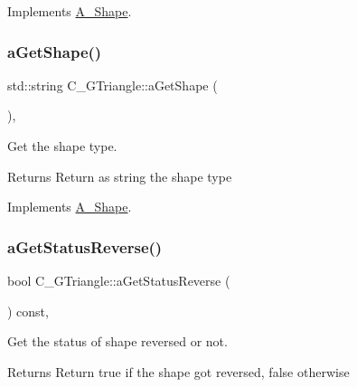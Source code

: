 Implements \hyperlink{classA__Shape_a9fd1285bd63b1fc88943c9969bf01a5c}{A\+\_\+\+Shape}.

\mbox{\label{classC__GTriangle_a039e79bb17dae01997b11243de457d98}} 
\subsubsection{\texorpdfstring{a\+Get\+Shape()}{aGetShape()}}
{\footnotesize\ttfamily std\+::string C\+\_\+\+G\+Triangle\+::a\+Get\+Shape (\begin{DoxyParamCaption}{ }\end{DoxyParamCaption})\hspace{0.3cm}{\ttfamily [override]}, {\ttfamily [virtual]}}



Get the shape type. 

\begin{DoxyReturn}{Returns}
Return as string the shape type 
\end{DoxyReturn}


Implements \hyperlink{classA__Shape_a1b202256a4e5dcb0edab4ab93a37122c}{A\+\_\+\+Shape}.

\mbox{\label{classC__GTriangle_a8aa6444f3d7f001f61cd3903a46f4b67}} 
\subsubsection{\texorpdfstring{a\+Get\+Status\+Reverse()}{aGetStatusReverse()}}
{\footnotesize\ttfamily bool C\+\_\+\+G\+Triangle\+::a\+Get\+Status\+Reverse (\begin{DoxyParamCaption}{ }\end{DoxyParamCaption}) const\hspace{0.3cm}{\ttfamily [override]}, {\ttfamily [virtual]}}



Get the status of shape reversed or not. 

\begin{DoxyReturn}{Returns}
Return true if the shape got reversed, false otherwise 
\end{DoxyReturn}


